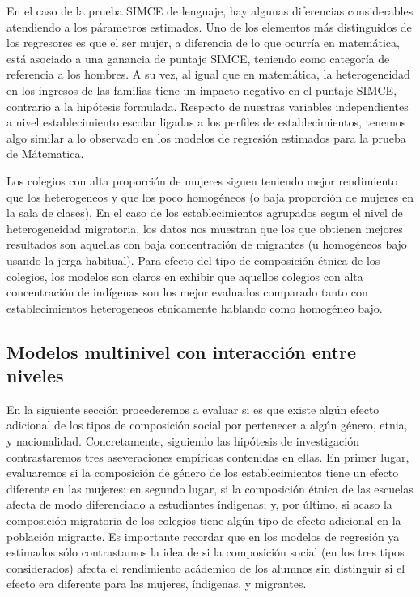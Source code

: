 \documentclass[
]{article}
\begin{document}
En el caso de la prueba SIMCE de lenguaje, hay algunas diferencias
considerables atendiendo a los párametros estimados. Uno de los
elementos más distinguidos de los regresores es que el ser mujer, a
diferencia de lo que ocurría en matemática, está asociado a una ganancia
de puntaje SIMCE, teniendo como categoría de referencia a los hombres. A
su vez, al igual que en matemática, la heterogeneidad en los ingresos de
las familias tiene un impacto negativo en el puntaje SIMCE, contrario a
la hipótesis formulada. Respecto de nuestras variables independientes a
nivel establecimiento escolar ligadas a los perfiles de
establecimientos, tenemos algo similar a lo observado en los modelos de
regresión estimados para la prueba de Mátematica.

Los colegios con alta proporción de mujeres siguen teniendo mejor
rendimiento que los heterogeneos y que los poco homogéneos (o baja
proporción de mujeres en la sala de clases). En el caso de los
establecimientos agrupados segun el nivel de heterogeneidad migratoria,
los datos nos muestran que los que obtienen mejores resultados son
aquellas con baja concentración de migrantes (u homogéneos bajo usando
la jerga habitual). Para efecto del tipo de composición étnica de los
colegios, los modelos son claros en exhibir que aquellos colegios con
alta concentración de indígenas son los mejor evaluados comparado tanto
con establecimientos heterogeneos etnicamente hablando como homogéneo
bajo.

\hypertarget{modelos-multinivel-con-interacciuxf3n-entre-niveles}{%
\subsection{Modelos multinivel con interacción entre
niveles}\label{modelos-multinivel-con-interacciuxf3n-entre-niveles}}

En la siguiente sección procederemos a evaluar si es que existe algún
efecto adicional de los tipos de composición social por pertenecer a
algún género, etnia, y nacionalidad. Concretamente, siguiendo las
hipótesis de investigación contrastaremos tres aseveraciones empíricas
contenidas en ellas. En primer lugar, evaluaremos si la composición de
género de los establecimientos tiene un efecto diferente en las mujeres;
en segundo lugar, si la composición étnica de las escuelas afecta de
modo diferenciado a estudiantes índigenas; y, por último, si acaso la
composición migratoria de los colegios tiene algún tipo de efecto
adicional en la población migrante. Es importante recordar que en los
modelos de regresión ya estimados sólo contrastamos la idea de si la
composición social (en los tres tipos considerados) afecta el
rendimiento acádemico de los alumnos sin distinguir si el efecto era
diferente para las mujeres, índigenas, y migrantes.
\end{document}
